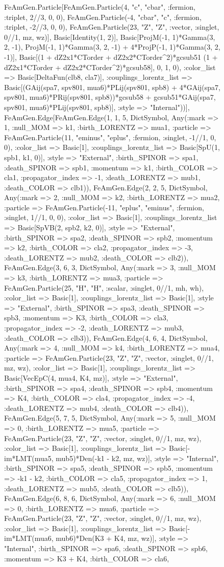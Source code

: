 \documentclass{revtex4}
\begin{document}
\begin{figure}[!htb]
\begin{center}
{FeAmGen.Particle[FeAmGen.Particle(4, "c", "cbar", :fermion, :triplet, 2//3, 0, 0), FeAmGen.Particle(-4, "cbar", "c", :fermion, :triplet, -2//3, 0, 0), FeAmGen.Particle(23, "Z", "Z", :vector, :singlet, 0//1, mz, wz)], Basic[Identity(1, 2)], Basic[ProjM(-1, 1)*Gamma(3, 2, -1), ProjM(-1, 1)*Gamma(3, 2, -1) + 4*ProjP(-1, 1)*Gamma(3, 2, -1)], Basic[(1 + dZ2x1*CTorder + dZ2x2*CTorder^2)*gcsub51 (1 + dZ2x1*CTorder + dZ2x2*CTorder^2)*gcsub58], 0, 1, 0), :color_list => Basic[DeltaFun(clb8, cla7)], :couplings_lorentz_list => Basic[(GAij(spa7, spv801, mua6)*PLij(spv801, spb8) + 4*GAij(spa7, spv801, mua6)*PRij(spv801, spb8))*gcsub58 + gcsub51*GAij(spa7, spv801, mua6)*PLij(spv801, spb8)], :style => "Internal"))], FeAmGen.Edge[FeAmGen.Edge(1, 1, 5, Dict{Symbol, Any}(:mark => 1, :null_MOM => k1, :birth_LORENTZ => mua1, :particle => FeAmGen.Particle(11, "eminus", "eplus", :fermion, :singlet, -1//1, 0, 0), :color_list => Basic[1], :couplings_lorentz_list => Basic[SpU(1, spb1, k1, 0)], :style => "External", :birth_SPINOR => spa1, :death_SPINOR => spb1, :momentum => k1, :birth_COLOR => cla1, :propagator_index => -1, :death_LORENTZ => mub1, :death_COLOR => clb1)), FeAmGen.Edge(2, 2, 5, Dict{Symbol, Any}(:mark => 2, :null_MOM => k2, :birth_LORENTZ => mua2, :particle => FeAmGen.Particle(-11, "eplus", "eminus", :fermion, :singlet, 1//1, 0, 0), :color_list => Basic[1], :couplings_lorentz_list => Basic[SpVB(2, spb2, k2, 0)], :style => "External", :birth_SPINOR => spa2, :death_SPINOR => spb2, :momentum => k2, :birth_COLOR => cla2, :propagator_index => -3, :death_LORENTZ => mub2, :death_COLOR => clb2)), FeAmGen.Edge(3, 6, 3, Dict{Symbol, Any}(:mark => 3, :null_MOM => k3, :birth_LORENTZ => mua3, :particle => FeAmGen.Particle(25, "H", "H", :scalar, :singlet, 0//1, mh, wh), :color_list => Basic[1], :couplings_lorentz_list => Basic[1], :style => "External", :birth_SPINOR => spa3, :death_SPINOR => spb3, :momentum => K3, :birth_COLOR => cla3, :propagator_index => -2, :death_LORENTZ => mub3, :death_COLOR => clb3)), FeAmGen.Edge(4, 6, 4, Dict{Symbol, Any}(:mark => 4, :null_MOM => k4, :birth_LORENTZ => mua4, :particle => FeAmGen.Particle(23, "Z", "Z", :vector, :singlet, 0//1, mz, wz), :color_list => Basic[1], :couplings_lorentz_list => Basic[VecEpC(4, mua4, K4, mz)], :style => "External", :birth_SPINOR => spa4, :death_SPINOR => spb4, :momentum => K4, :birth_COLOR => cla4, :propagator_index => -4, :death_LORENTZ => mub4, :death_COLOR => clb4)), FeAmGen.Edge(5, 7, 5, Dict{Symbol, Any}(:mark => 5, :null_MOM => 0, :birth_LORENTZ => mua5, :particle => FeAmGen.Particle(23, "Z", "Z", :vector, :singlet, 0//1, mz, wz), :color_list => Basic[1], :couplings_lorentz_list => Basic[-im*LMT(mua5, mub5)*Den(-k1 - k2, mz, wz)], :style => "Internal", :birth_SPINOR => spa5, :death_SPINOR => spb5, :momentum => -k1 - k2, :birth_COLOR => cla5, :propagator_index => 1, :death_LORENTZ => mub5, :death_COLOR => clb5)), FeAmGen.Edge(6, 8, 6, Dict{Symbol, Any}(:mark => 6, :null_MOM => 0, :birth_LORENTZ => mua6, :particle => FeAmGen.Particle(23, "Z", "Z", :vector, :singlet, 0//1, mz, wz), :color_list => Basic[1], :couplings_lorentz_list => Basic[-im*LMT(mua6, mub6)*Den(K3 + K4, mz, wz)], :style => "Internal", :birth_SPINOR => spa6, :death_SPINOR => spb6, :momentum => K3 + K4, :birth_COLOR => cla6, }
\end{center}
\end{figure}
\end{document}
